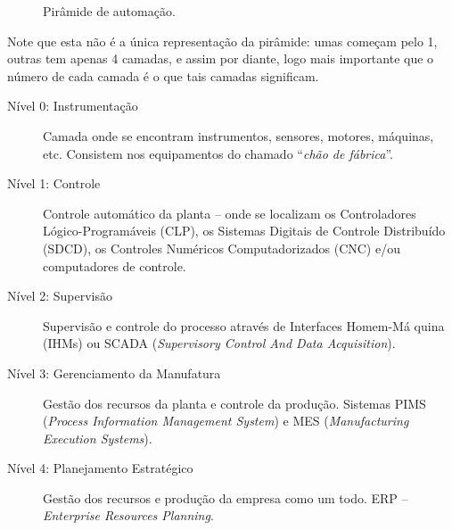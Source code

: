 \begin{figure}[htb]
\begin{center}
\begin{tikzpicture}[y=0.80pt, x=0.8pt,xscale=0.4,yscale=-0.4, inner sep=0pt, outer sep=0pt]
\end{tikzpicture}
	\end{center}
	\caption{Pirâmide de automação.}
	\label{fig:piramide}
\end{figure}

Note que esta não é a única representação da pirâmide: umas começam pelo 1, outras tem apenas 4 camadas, e assim por diante, logo mais importante que o número de cada camada é o que tais camadas significam.

\begin{description}
	\item[Nível 0: Instrumentação] Camada onde se encontram instrumentos, sensores, motores,
máquinas, etc. Consistem nos equipamentos do chamado ``\emph{chão de fábrica}''.
\item[Nível 1: Controle] Controle automático da planta -- onde se localizam os Controladores
Lógico-Programáveis (CLP), os Sistemas Digitais de Controle Distribuído (SDCD), os Controles Numéricos Computadorizados (CNC) e/ou computadores de controle.
\item[Nível 2: Supervisão] Supervisão e controle do processo através de Interfaces Homem-Má
quina (IHMs) ou SCADA (\emph{Supervisory Control And Data Acquisition}).
\item[Nível 3: Gerenciamento da Manufatura] Gestão dos recursos da planta e controle da produção.  Sistemas PIMS
(\emph{Process Information Management System}) e MES (\emph{Manufacturing Execution Systems}).
\item[Nível 4: Planejamento Estratégico] Gestão dos recursos e produção da empresa como um todo. ERP –
\emph{Enterprise Resources Planning}.
\end{description}

